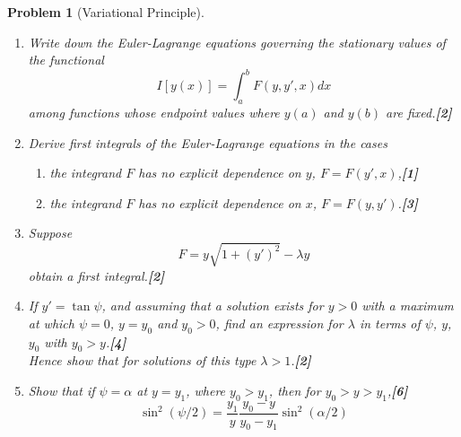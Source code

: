 \documentclass[a4paper]{article}
\theoremstyle{new}
\newtheorem{qns}{Problem}[section]
\begin{document}
\begin{qns}[Variational Principle]\leavevmode
\begin{enumerate}[label=(\roman*)]
\item Write down the Euler-Lagrange equations governing the stationary values of the functional
$$I[y(x)]=\int_a^bF(y,y',x)dx$$
among functions whose endpoint values where $y(a)$ and $y(b)$ are fixed.\hfill \textbf{[2]}
\item Derive first integrals of the Euler-Lagrange equations in the cases
\begin{enumerate}[label=(\alph*)]
\item the integrand $F$ has no explicit dependence on $y$, $F = F(y', x)$,\hfill \textbf{[1]}
\item the integrand $F$ has no explicit dependence on $x$, $F = F(y, y')$.\hfill \textbf{[3]}
\end{enumerate}
\item Suppose
$$F=y\sqrt{1+(y')^2}-\lambda y$$
obtain a first integral.\hfill \textbf{[2]}
\item If $y'=\tan\psi$, and assuming that a solution exists for $y > 0$ with a maximum at which $\psi=0$, $y=y_0$ and $y_0>0$, find an expression for $\lambda$ in terms of $\psi$, $y$, $y_0$ with $y_0 > y$.\hfill \textbf{[4]}\\[5pt]
Hence show that for solutions of this type $\lambda>1$.\hfill \textbf{[2]}
\item Show that if  $\psi=\alpha$ at $y = y_1$, where $y_0 > y_1$, then for $y_0 > y > y_1$,\hfill \textbf{[6]}
$$\sin^2(\psi/2)=\frac{y_1}{y}\frac{y_0-y}{y_0-y_1}\sin^2(\alpha/2)$$
\end{enumerate}
\end{qns}
\end{document}
